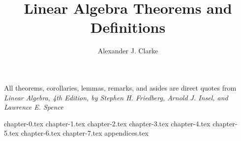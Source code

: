 \documentclass[12pt,letterpaper]{report}
\author{Alexander J. Clarke}
\title{Linear Algebra Theorems and Definitions}
\begin{document}
\maketitle
\clearpage
\begin{center}
	\thispagestyle{empty}
	\vspace*{\fill}
	All theorems, corollaries, lemmas, remarks, and asides are direct quotes from\\

	\textit{Linear Algebra, 4th Edition, by Stephen H. Friedberg, Arnold J. Insel, and Lawrence E. Spence}
	\vspace*{\fill}
\end{center}
\tableofcontents

{chapter-0.tex}
{chapter-1.tex}
{chapter-2.tex}
{chapter-3.tex}
{chapter-4.tex}
{chapter-5.tex}
{chapter-6.tex}
{chapter-7.tex}
{appendices.tex}
\end{document}
